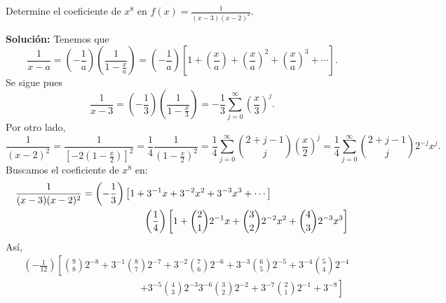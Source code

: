 \begin{myexample}
    Determine el coeficiente de $x^8$ en $\displaystyle f(x) = \frac{1}{(x-3)(x-2)^2}$.

    \tcblower
    \textbf{\color{jblueleft}Solución:} Tenemos que
    $$\frac{1}{x-a} = \left( - \frac{1}{a} \right) \left( \frac{1}{1-\displaystyle\frac{x}{a}} \right) = \left( - \frac{1}{a} \right) \left[ 1 + \left( \frac{x}{a} \right) + \left( \frac{x}{a} \right)^2 + \left( \frac{x}{a} \right)^3 + \cdots \right].$$
    Se sigue pues
    $$\frac{1}{x-3} = \left( -\frac{1}{3} \right) \left( \frac{1}{1-\displaystyle\frac{x}{3}} \right) = -\frac{1}{3} \sum_{j=0}^{\infty} \left(\frac{x}{3}\right)^{j}.$$
    Por otro lado,
    $$\frac{1}{(x-2)^{2}} = \frac{1}{\left[ -2 \left(1-\displaystyle\frac{x}{2}\right) \right]^{2}} = \frac{1}{4} \frac{1}{\left( 1-\displaystyle\frac{x}{2} \right)^{2}} = \frac{1}{4} \sum_{j=0}^{\infty} \binom{2+j-1}{j} \left( \frac{x}{2} \right)^{j} = \frac{1}{4} \sum_{j=0}^{\infty} \binom{2+j-1}{j}  2^{-j}x^{j}.$$
    Buscamos el coeficiente de $x^{8}$ en:
    \begin{align*}
        \frac{1}{(x-3)(x-2)^2} & = \left( - \frac{1}{3} \right) \left[ 1 + 3^{-1}x + 3^{-2}x^{2} + 3^{-3}x^{3} + \cdots \right] \\
        & \hspace{2.2cm} \left( \frac{1}{4} \right) \left[ 1 + \binom{2}{1}2^{-1}x + \binom{3}{2}2^{-2}x^{2} + \binom{4}{3}2^{-3}x^{3} \right]
    \end{align*}
    Así,
    \begin{align*}
        & \left( - \frac{1}{12} \right) \left[ \binom{9}{8} 2^{-8} + 3^{-1} \binom{8}{7} 2^{-7} +  3^{-2} \binom{7}{6} 2^{-6} + 3^{-3} \binom{6}{5} 2^{-5} + 3^{-4} \binom{5}{4} 2^{-4} \right. \\
        & \hspace{5cm}\left. + 3^{-5} \binom{4}{3} 2^{-3} 3^{-6} \binom{3}{2} 2^{-2} + 3^{-7} \binom{2}{1} 2^{-1} + 3^{-8} \right]
    \end{align*}
\end{myexample}

